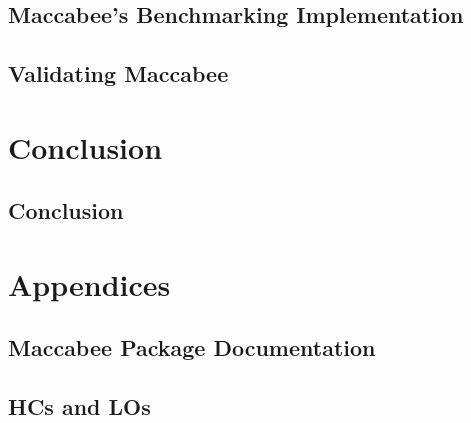 \documentclass[oneside, fleqn]{book}
\begin{document}
\chapter{Maccabee's Benchmarking Implementation}
\label{chap:macimplementation}

\chapter{Validating Maccabee}
\label{chap:macvalidation}


\part{Conclusion}
\chapter{Conclusion}
\label{chap:conclusion}


\part{Appendices}
\appendix

\chapter{Maccabee Package Documentation}
\label{app:package-docs}


\chapter{HCs and LOs}
\label{app:hclo}


\backmatter

 
\end{document}
